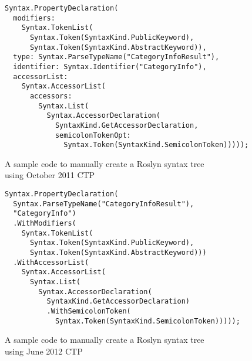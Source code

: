 \begin{figure}[p]

\begin{lstlisting}
Syntax.PropertyDeclaration(
  modifiers:
    Syntax.TokenList(
      Syntax.Token(SyntaxKind.PublicKeyword),
      Syntax.Token(SyntaxKind.AbstractKeyword)),
  type: Syntax.ParseTypeName("CategoryInfoResult"),
  identifier: Syntax.Identifier("CategoryInfo"),
  accessorList:
    Syntax.AccessorList(
      accessors:
        Syntax.List(
          Syntax.AccessorDeclaration(
            SyntaxKind.GetAccessorDeclaration,
            semicolonTokenOpt:
              Syntax.Token(SyntaxKind.SemicolonToken)))));
\end{lstlisting}

\caption{A sample code to manually create a Roslyn syntax tree \\ using October 2011 CTP}
\label{Roslyn code 2011}
\end{figure}

\begin{figure}[p]

\begin{lstlisting}
Syntax.PropertyDeclaration(
  Syntax.ParseTypeName("CategoryInfoResult"),
  "CategoryInfo")
  .WithModifiers(
    Syntax.TokenList(
      Syntax.Token(SyntaxKind.PublicKeyword),
      Syntax.Token(SyntaxKind.AbstractKeyword)))
  .WithAccessorList(
    Syntax.AccessorList(
      Syntax.List(
        Syntax.AccessorDeclaration(
          SyntaxKind.GetAccessorDeclaration)
          .WithSemicolonToken(
            Syntax.Token(SyntaxKind.SemicolonToken)))));
\end{lstlisting}

\caption{A sample code to manually create a Roslyn syntax tree \\ using June 2012 CTP}
\label{Roslyn code 2012}
\end{figure}